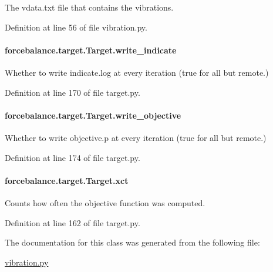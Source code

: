 The vdata.\-txt file that contains the vibrations. 



Definition at line 56 of file vibration.\-py.

\hypertarget{classforcebalance_1_1target_1_1Target_a3a2f5d4bbb8d6ecb580eadb261977a57}{
\paragraph[{write\-\_\-indicate}]{\setlength{\rightskip}{0pt plus 5cm}forcebalance.\-target.\-Target.\-write\-\_\-indicate\hspace{0.3cm}{\ttfamily [inherited]}}}\label{classforcebalance_1_1target_1_1Target_a3a2f5d4bbb8d6ecb580eadb261977a57}


Whether to write indicate.\-log at every iteration (true for all but remote.) 



Definition at line 170 of file target.\-py.

\hypertarget{classforcebalance_1_1target_1_1Target_a7a95624dfe03f0cee0e5f1ae09db306a}{
\paragraph[{write\-\_\-objective}]{\setlength{\rightskip}{0pt plus 5cm}forcebalance.\-target.\-Target.\-write\-\_\-objective\hspace{0.3cm}{\ttfamily [inherited]}}}\label{classforcebalance_1_1target_1_1Target_a7a95624dfe03f0cee0e5f1ae09db306a}


Whether to write objective.\-p at every iteration (true for all but remote.) 



Definition at line 174 of file target.\-py.

\hypertarget{classforcebalance_1_1target_1_1Target_aad2e385cfbf7b4a68f1c2cb41133fe82}{
\paragraph[{xct}]{\setlength{\rightskip}{0pt plus 5cm}forcebalance.\-target.\-Target.\-xct\hspace{0.3cm}{\ttfamily [inherited]}}}\label{classforcebalance_1_1target_1_1Target_aad2e385cfbf7b4a68f1c2cb41133fe82}


Counts how often the objective function was computed. 



Definition at line 162 of file target.\-py.



The documentation for this class was generated from the following file\-:\begin{DoxyCompactItemize}
\item 
\hyperlink{vibration_8py}{vibration.\-py}\end{DoxyCompactItemize}
